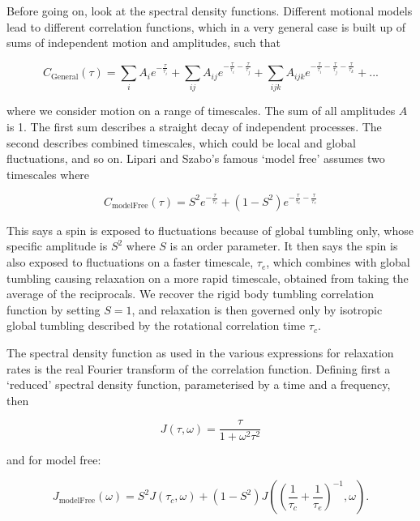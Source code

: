 \documentclass[showkeys,aps,prb,prepreint,amssymb, amsmath,nobibnotes]{article}
\begin{document}
Before going on, look at the spectral density functions. Different motional models lead to different correlation functions, which in a very general case is built up of sums of independent motion and amplitudes, such that

\begin{equation}
  C_{\mathrm{General}}(\tau)= \sum_i  A_{i} e^{-\frac{\tau}{\tau_i}}+ \sum_{ij} A_{ij} e^{-\frac{\tau}{\tau_i}-\frac{\tau}{\tau_j}}+ \sum_{ijk}  A_{ijk} e^{-\frac{\tau}{\tau_i}-\frac{\tau}{\tau_j}-\frac{\tau}{\tau_k}} +...
  \end{equation}

where we consider motion on a range of timescales. The sum of all amplitudes $A$ is 1. The first sum describes a straight decay of independent processes. The second describes combined timescales, which could be local and global fluctuations, and so on. Lipari and Szabo's famous `model free' assumes two timescales where

\begin{equation}
  C_{\mathrm{modelFree}}(\tau)= S^2 e^{-\frac{\tau}{\tau_c}} + (1-S^2) e^{-\frac{\tau}{\tau_c}-\frac{\tau}{\tau_e}}
  \end{equation}

This says a spin is exposed to fluctuations because of global tumbling only, whose specific amplitude is $S^2$ where $S$ is an order parameter. It then says the spin is also exposed to fluctuations on a faster timescale, $\tau_e$, which combines with global tumbling causing relaxation on a more rapid timescale, obtained from taking the average of the reciprocals. We recover the rigid body tumbling correlation function by setting $S=1$, and relaxation is then governed only by isotropic global tumbling described by the rotational correlation time $\tau_c$.

The spectral density function as used in the various expressions for relaxation rates is the real Fourier transform of the correlation function. Defining first a `reduced' spectral density function, parameterised by a time and a frequency, then

\begin{equation}
J(\tau,\omega)=\frac{\tau}{1+\omega^2\tau^2}
\end{equation}

and for model free:

\begin{equation}
J_{\mathrm{modelFree}}(\omega)= S^2 J(\tau_c,\omega) + (1-S^2) J\left(  \left(\frac{1}{\tau_c}+\frac{1}{\tau_e}\right)^{-1},\omega\right).
  \end{equation}
\end{document}
